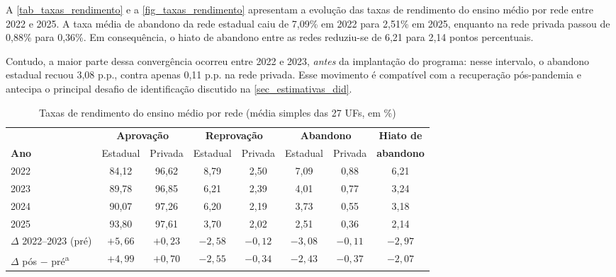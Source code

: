 A \autoref{tab_taxas_rendimento} e a \autoref{fig_taxas_rendimento} apresentam a evolução das taxas de rendimento do ensino médio por rede entre 2022 e 2025.
A taxa média de abandono da rede estadual caiu de 7,09\% em 2022 para 2,51\% em 2025, enquanto na rede privada passou de 0,88\% para 0,36\%.
Em consequência, o hiato de abandono entre as redes reduziu-se de 6,21 para 2,14 pontos percentuais.

Contudo, a maior parte dessa convergência ocorreu entre 2022 e 2023, \textit{antes} da implantação do programa: nesse intervalo, o abandono estadual recuou 3,08 p.p., contra apenas 0,11 p.p. na rede privada.
Esse movimento é compatível com a recuperação pós-pandemia e antecipa o principal desafio de identificação discutido na \autoref{sec_estimativas_did}.

\begin{table}[!htb]
    \centering
    \caption{Taxas de rendimento do ensino médio por rede (média simples das 27 UFs, em \%)}
    \label{tab_taxas_rendimento}
    \small
    \begin{tabular}{lccccccc}
        \toprule
        & \multicolumn{2}{c}{\textbf{Aprovação}} & \multicolumn{2}{c}{\textbf{Reprovação}} & \multicolumn{2}{c}{\textbf{Abandono}} & \textbf{Hiato de} \\
        \cmidrule(lr){2-3} \cmidrule(lr){4-5} \cmidrule(lr){6-7}
        \textbf{Ano} & Estadual & Privada & Estadual & Privada & Estadual & Privada & \textbf{abandono} \\
        \midrule
        2022 & 84,12 & 96,62 & 8,79 & 2,50 & 7,09 & 0,88 & 6,21 \\
        2023 & 89,78 & 96,85 & 6,21 & 2,39 & 4,01 & 0,77 & 3,24 \\
        2024 & 90,07 & 97,26 & 6,20 & 2,19 & 3,73 & 0,55 & 3,18 \\
        2025 & 93,80 & 97,61 & 3,70 & 2,02 & 2,51 & 0,36 & 2,14 \\
        \midrule
        $\Delta$ 2022--2023 (pré) & $+5{,}66$ & $+0{,}23$ & $-2{,}58$ & $-0{,}12$ & $-3{,}08$ & $-0{,}11$ & $-2{,}97$ \\
        $\Delta$ pós $-$ pré\textsuperscript{a} & $+4{,}99$ & $+0{,}70$ & $-2{,}55$ & $-0{,}34$ & $-2{,}43$ & $-0{,}37$ & $-2{,}07$ \\
        \bottomrule
    \end{tabular}
\end{table}

